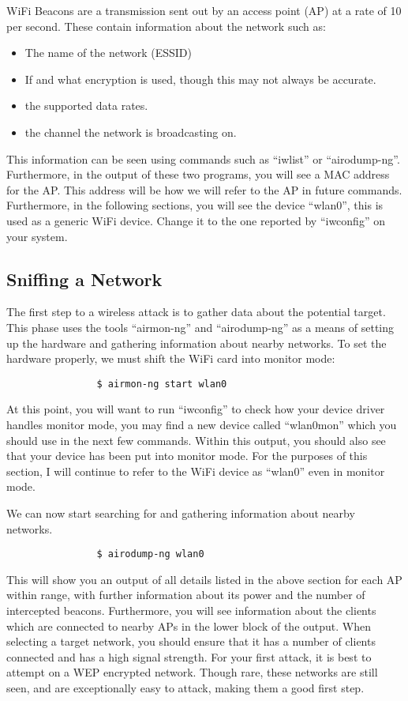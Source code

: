 			WiFi Beacons are a transmission sent out by an access point (AP) at a rate of 10 per second.
			These contain information about the network such as:
			\begin{itemize}
				\item The name of the network (ESSID)
				\item If and what encryption is used, though this may not always be accurate.
				\item the supported data rates.
				\item the channel the network is broadcasting on.
			\end{itemize}
			This information can be seen using commands such as ``iwlist'' or ``airodump-ng''.
			Furthermore, in the output of these two programs, you will see a MAC address for the AP.
			This address will be how we will refer to the AP in future commands.
			Furthermore, in the following sections, you will see the device ``wlan0'', this is used as a generic WiFi device.
			Change it to the one reported by ``iwconfig'' on your system.
		\subsection{Sniffing a Network}
			The first step to a wireless attack is to gather data about the potential target.
			This phase uses the tools ``airmon-ng'' and ``airodump-ng'' as a means of setting up the hardware and gathering information about nearby networks.
			 
			To set the hardware properly, we must shift the WiFi card into monitor mode:
			\begin{verbatim}
				$ airmon-ng start wlan0
			\end{verbatim}
			At this point, you will want to run ``iwconfig'' to check how your device driver handles monitor mode, you may find a new device called ``wlan0mon'' which you should use in the next few commands.
			Within this output, you should also see that your device has been put into monitor mode.
			For the purposes of this section, I will continue to refer to the WiFi device as ``wlan0'' even in monitor mode.

			We can now start searching for and gathering information about nearby networks.
			\begin{verbatim}
				$ airodump-ng wlan0
			\end{verbatim}
			This will show you an output of all details listed in the above section for each AP within range, with further information about its power and the number of intercepted beacons.
			Furthermore, you will see information about the clients which are connected to nearby APs in the lower block of the output.
			When selecting a target network, you should ensure that it has a number of clients connected and has a high signal strength.
			For your first attack, it is best to attempt on a WEP encrypted network.
			Though rare, these networks are still seen, and are exceptionally easy to attack, making them a good first step.

